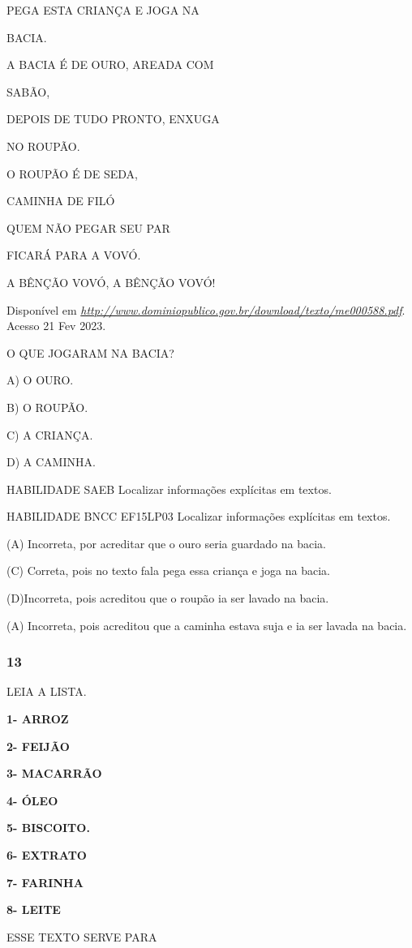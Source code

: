 \begin{escola}
PEGA ESTA CRIANÇA E JOGA NA

BACIA.

A BACIA É DE OURO, AREADA COM

SABÃO,

DEPOIS DE TUDO PRONTO, ENXUGA

NO ROUPÃO.

O ROUPÃO É DE SEDA,

CAMINHA DE FILÓ

QUEM NÃO PEGAR SEU PAR

FICARÁ PARA A VOVÓ.

A BÊNÇÃO VOVÓ, A BÊNÇÃO VOVÓ!

Disponível em
\href{http://www.dominiopublico.gov.br/download/texto/me000588.pdf}{\emph{http://www.dominiopublico.gov.br/download/texto/me000588.pdf}}.
Acesso 21 Fev 2023.

O QUE JOGARAM NA BACIA?

A) O OURO.

B) O ROUPÃO.

C) A CRIANÇA.

D) A CAMINHA.

HABILIDADE SAEB Localizar informações explícitas em textos.

HABILIDADE BNCC EF15LP03 Localizar informações explícitas em textos.

(A) Incorreta, por acreditar que o ouro seria guardado na bacia.

(C) Correta, pois no texto fala pega essa criança e joga na bacia.

(D)Incorreta, pois acreditou que o roupão ia ser lavado na bacia.

(A) Incorreta, pois acreditou que a caminha estava suja e ia ser lavada
na bacia.

\subsubsection{13 }\label{section-69}

LEIA A LISTA.

\textbf{1- ARROZ}

\textbf{2- FEIJÃO}

\textbf{3- MACARRÃO}

\textbf{4- ÓLEO}

\textbf{5- BISCOITO.}

\textbf{6- EXTRATO}

\textbf{7- FARINHA}

\textbf{8- LEITE}

ESSE TEXTO SERVE PARA


\end{escola}
